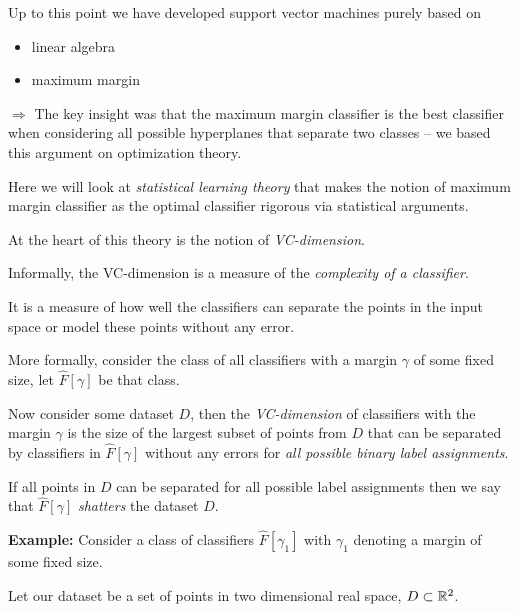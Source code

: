 \documentclass[a4paper,blends,pdf,colorBG,slideColor]{prosper}
\begin{document}
Up to this point we have developed support vector machines purely based on
\begin{itemize}
\item linear algebra 
\item maximum margin
\end{itemize}

$\Rightarrow$ The key insight was that the maximum margin
classifier is the best classifier when considering all possible hyperplanes
that separate two classes -- we based this argument on optimization theory.

Here we will look at 
{\em statistical learning
theory} that makes the notion of maximum margin classifier as the optimal classifier rigorous via statistical arguments.

At the heart of this theory is the notion of {\em VC-dimension}.

\es

Informally, the VC-dimension is a 
measure of the {\em complexity of a classifier}.

It is a measure of how well the classifiers can separate the points
in the input space or model these points without any error.

\es

More formally, consider the class of all classifiers with a margin
$\gamma$ of some fixed size, let $\hat{F}[\gamma]$ be that class.  

Now consider some dataset
$D$, then the {\em VC-dimension} of classifiers with the margin
$\gamma$ is the size of the largest subset of 
points from $D$ that can be separated
by classifiers in $\hat{F}[\gamma]$
without any errors for {\em all possible binary label assignments}.

If all points in $D$ can be separated for all possible
label assignments then we say that $\hat{F}[\gamma]$ {\em shatters} the dataset $D$.


\es

\small
{\bf Example:} Consider a class of classifiers $\hat{F}[\gamma_1]$ with $\gamma_1$
denoting a margin of some fixed size.  

Let our dataset 
be a set of points in two dimensional real space, $D \subset \mathbb{R}^{2}$.  
\end{document}
